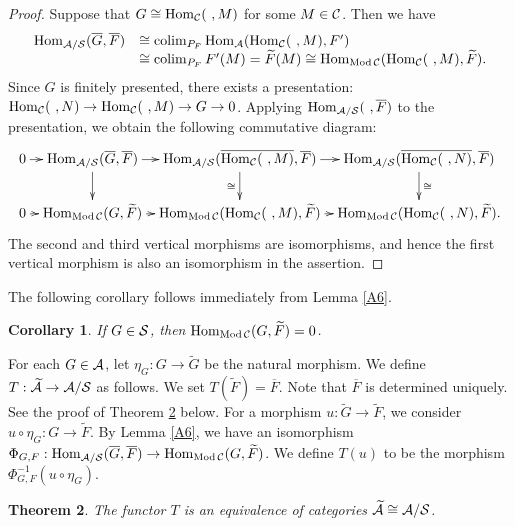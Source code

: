 \documentclass[11pt]{amsart}
\newtheorem{theorem}{Theorem}[section]
\newtheorem{corollary}[theorem]{Corollary}
\theoremstyle{definition}
\numberwithin{equation}{section}
\begin{document}
\begin{proof}
Suppose that $G \cong \Hom _{\CC}(\  , M)$ for some $M \in \CC$. 
Then we have
$$
\begin{array}{ll}
\Hom_{\AA /  \SS } ( \overline{G}, \overline{F}) &\cong \colim_{P_F} \Hom_{\AA} (\Hom _{\CC} (\  , M), F' )\\
&\cong \colim_{P_F}  F'(M) = \widetilde{F} (M) \cong \Hom_{\ModCC} (\Hom _{\CC}(\  , M), \widetilde{F}). 
\end{array}
$$
Since $G$ is finitely presented, there exists a presentation: $\Hom _{\CC}(\  , N) \to \Hom _{\CC}(\ , M) \to G \to 0$. 
Applying $\Hom_{\AA / \SS} (\  ,  \overline{F})$ to the presentation, we obtain the following commutative diagram: 
$$
\xymatrix@C=0.6em@R=2em{
0\ar[r]&\Hom_{\AA/\SS}(\overline{G},\overline{F})\ar[r]\ar[d]&\Hom_{\AA/\SS}(\overline{\Hom_{\CC}(\ ,M)}, \overline{F} )\ar[r]\ar[d]_{\cong}&\Hom_{\AA/\SS}(\overline{\Hom_{\CC}(\ ,N)}, \overline{F}) \ar[d]^{\cong} \\
0\ar[r] &\Hom_{\ModCC}(G,\widetilde{F})\ar[r] &\Hom_{\ModCC}(\Hom_{\CC}(\ ,M),\widetilde{F})\ar[r]&\Hom_{\ModCC}(\Hom_{\CC}(\ ,N), \widetilde{F}).}
$$
The second and third vertical morphisms are isomorphisms, and hence the first vertical morphism is also an isomorphism in the assertion. 
\end{proof}

The following corollary follows immediately from Lemma \ref{A6}. 

\begin{corollary}\label{A7}
If $G \in \SS$, then $\Hom_{\ModCC} (G, \widetilde{F})=0$. 
\end{corollary}


For each $G \in \AA$, let $\eta_G : G \to \widetilde{G}$ be the natural morphism. 
We define $T: \widetilde{\AA } \to \AA/ \SS $ as follows. 
We set $T( \widetilde{F})=\overline{F}$. 
Note that $\overline{F}$ is determined uniquely. 
See the proof of Theorem \ref{A8} below. 
For a morphism $u: \widetilde{G} \to \widetilde{F}$, we consider $u \circ \eta_G : G \to \widetilde{F}$. 
By Lemma \ref{A6}, we have an isomorphism $\Phi_{G, F}: \Hom_{\AA /  \SS } ( \overline{G}, \overline{F}) \to \Hom_{\ModCC} (G, \widetilde{F})$. 
We define $T(u)$ to be the morphism $\Phi_{G, F}^{-1} (u \circ \eta_G)$. 


\begin{theorem}\label{A8}
The functor $T$ is an equivalence of categories $\widetilde{\AA} \cong \AA/ \SS$. 
\end{theorem}
\end{document}
